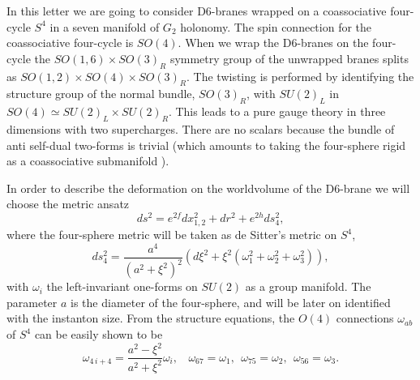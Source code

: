 \documentclass[12pt,a4paper]{article}
\begin{document}
In this letter we are going to consider D6-branes wrapped on a coassociative four-cycle $S^4$ 
in a seven manifold of $G_2$ holonomy. The spin connection for the coassociative four-cycle is 
$SO(4)$. When we wrap the D6-branes on the four-cycle the $SO(1,6) \times SO(3)_R$ 
symmetry group of the unwrapped branes splits as $SO(1,2) \times SO(4) \times SO(3)_R$. The 
twisting is performed by identifying the structure group of the normal bundle, $SO(3)_R$, 
with $SU(2)_L$ in $SO(4) \simeq SU(2)_L \times SU(2)_R$. This leads to a pure gauge theory in three 
dimensions with two supercharges. There are no scalars \cite{Gomis} because the bundle of 
anti self-dual two-forms is trivial (which amounts to taking the four-sphere rigid as a coassociative 
submanifold \cite{McLean}).
  
In order to describe the deformation on the worldvolume of the D6-brane we will choose the 
metric ansatz 
\begin{equation}
ds^2 = e^{2f} dx_{1,2}^2 + dr^2 + e^{2h} ds_4^2,
\label{7}
\end{equation}
where the four-sphere metric will be taken as de Sitter's metric on $S^4$,
\begin{equation}
ds_4^2 = \frac {a^4}{(a^2 + \xi^2)^2} ( d \xi^2 + \xi^2 (\omega_1^2 + \omega_2^2 + \omega_3^2)),
\label{8}
\end{equation}
with $\omega_i$ the left-invariant one-forms on $SU(2)$ as a group manifold. The parameter $a$ is 
the diameter of the four-sphere, and will be later on identified with the instanton size. From 
the structure equations, the $O(4)$ connections $\omega_{ab}$ of $S^4$ can be easily shown to be
\begin{equation}
\omega_{4 \, i+4} = \frac {a^2 -\xi^2}{a^2 + \xi^2} \omega_i, \: \: \: \: \omega_{67} = \omega_1, 
\: \: \omega_{75} = \omega_2, \: \: \omega_{56} = \omega_3.
\label{9}
\end{equation}
  
\end{document}
